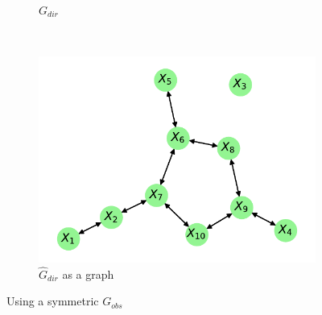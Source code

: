 \documentclass[../Thesis.tex]{subfiles}
\begin{document}
\begin{figure}[H]
\begin{subfigure}[t]{0.49\linewidth}
        \caption{$G_{dir}$}
    \end{subfigure}
    \\[\baselineskip]
    \begin{subfigure}[t]{0.49\linewidth}
        \includegraphics[width = \linewidth]{figures/ND examples/Gaussian network 10 - G_dir as graph - symmetric.pdf}
        \caption{$\hat{G}_{dir}$ as a graph}
    \end{subfigure}
    \caption{Using a symmetric $G_{obs}$}
\end{figure}
\end{document}
